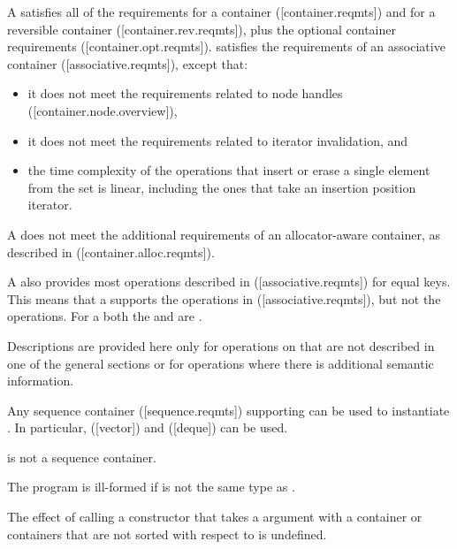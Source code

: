\begin{addedblock}
\pnum
A  satisfies all of the requirements for a container
([container.reqmts]) and for a reversible container ([container.rev.reqmts]),
plus the optional container requirements ([container.opt.reqmts]).  
satisfies the requirements of an associative container ([associative.reqmts]), except that:
\begin{itemize}
\item it does not meet the requirements related to node handles ([container.node.overview]),
\item it does not meet the requirements related to iterator invalidation, and
\item the time complexity of the operations that insert or erase a single
element from the set is linear, including the ones that take an insertion
position iterator.
\end{itemize}
\begin{note}A  does not meet the additional requirements of an
allocator-aware container, as described in ([container.alloc.reqmts]).\end{note}

\pnum
A  also provides most operations described in
([associative.reqmts]) for equal keys.  This means that a
 supports the  operations
in ([associative.reqmts]), but not the  operations.  For a
 both the  and  are
.

\pnum
Descriptions are provided here only for operations on 
that are not described in one of the general sections or for operations where
there is additional semantic information.

\pnum
Any sequence container ([sequence.reqmts]) supporting 
can be used to instantiate . In
particular,  ([vector]) and  ([deque]) can be
used.  \begin{note} is not a sequence container.\end{note}

\pnum
The program is ill-formed if  is not the same type
as .

\pnum
The effect of calling a constructor that takes a 
argument with a container or containers that are not sorted with respect
to  is undefined.


\end{addedblock}
